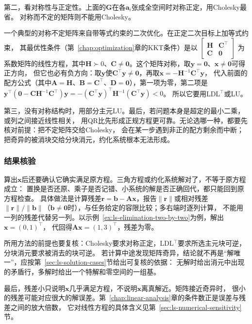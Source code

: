 第二，看对称性与正定性。上面的$\bm G$在各$\bm a_i$张成全空间时对称正定，用Cholesky最省。
对称而不定的矩阵则不能用Cholesky。

一个典型的对称不定矩阵来自带等式约束的二次优化。在正定二次目标上加等式约束，
其最优性条件（第~\ref{chap:optimization}章的KKT条件）是以
$\left[\begin{smallmatrix}\bm H&\bm C^\top\\\bm C&\bm0\end{smallmatrix}\right]$
为系数矩阵的线性方程，其中$\bm H\succ0$、$\bm C\neq\bm0$。这个矩阵对称，取$\bm y=\bm0$、$\bm x\neq\bm0$可得正方向，
但它也必有负方向：取$\bm y$使$\bm C^\top\bm y\neq\bm0$，再取$\bm x=-\bm H^{-1}\bm C^\top\bm y$，
代入前面的配方公式（其中$\bm A=\bm H$、$\bm B=\bm C^\top$、$\bm D=\bm0$），第一项为零，第二项是
$\bm y^\top(\bm0-\bm C\bm H^{-1}\bm C^\top)\bm y=-(\bm C^\top\bm y)^\top\bm H^{-1}(\bm C^\top\bm y)<0$。
所以它要用LDL$^{\top}$或LU。

第三，没有对称结构时，用部分主元LU。最后，若问题本身是超定的最小二乘，或列之间接近线性相关，
用QR比先形成正规方程更可靠。无论选哪一种，都要先核对前提：把不定矩阵交给Cholesky，
会在某一步遇到非正的配方剩余而中断；把奇异的被消块交给分块消元，约化系统根本无法形成。

\subsubsection{结果核验}
\label{sec:ls-linear-equation-verification}

算出$\bm x$后还要确认它确实满足原方程。三角方程或约化系统解对了，不等于原方程成立：
置换是否还原、乘子是否记错、小系统的解是否正确回代，都只能回到原方程检查。
具体做法是计算残差$\bm r=\bm b-\bm A\bm x$，报告$\lVert\bm r\rVert$或相对残差
$\lVert\bm r\rVert/\lVert\bm b\rVert$（$\bm b\neq\bm0$时），与任务给定的容限比较；多右端时逐列计算，
不能用一列的残差代替另一列。以示例~\ref{ex:ls-elimination-two-by-two}为例，解出$\bm x=(0,1)^\top$，
代回得$\bm A\bm x=(1,3)^\top$，残差为零。

所用方法的前提也要复核：Cholesky要求对称正定，LDL$^{\top}$要求所选主元块可逆，分块消元要求被消去的块可逆。
若计算中途发现矩阵奇异，结论就不再是“解唯一”，应按第~\ref{sec:ls-solution-cases}节给出可复核的依据：
无解时给出消元中出现的矛盾行，多解时给出一个特解和零空间的一组基。

最后，残差小只说明$\bm x$几乎满足方程，不说明$\bm x$离真解近。矩阵接近奇异时，
很小的残差可能对应很大的解误差。第~\ref{chap:linear-analysis}章的条件数正是误差与残差之间的放大倍数，
它对线性方程的具体含义见第~\ref{sec:ls-numerical-sensitivity}节。

